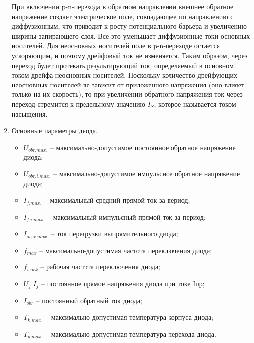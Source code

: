 \documentclass[a4paper,14pt]{article}
\begin{document}
\begin{enumerate}
	При включении p-n-перехода в обратном направлении внешнее обратное напряжение создает электрическое поле, совпадающее по направлению с диффузионным, что приводит к росту потенциального барьера и увеличению ширины запирающего слоя. 
	Все это уменьшает диффузионные токи основных носителей. 
	Для неосновных носителей поле в p-n-переходе остается ускоряющим, и поэтому дрейфовый ток не изменяется. Таким образом, через переход будет протекать результирующий ток, определяемый в основном током дрейфа неосновных носителей. 
	Поскольку количество дрейфующих неосновных носителей не зависит от приложенного напряжения (оно влияет только на их скорость), то при увеличении обратного напряжения ток через переход стремится к предельному значению $I_S$, которое называется током насыщения.

	\item Основные параметры диода.
	
	\begin{itemize}
      	\item $U_{obr.max.}$ -- максимально-допустимое постоянное обратное напряжение диода;
		
		\item $U_{obr.i.max.}$ -- максимально-допустимое импульсное обратное напряжение диода;
		
		\item $I_{f.max.}$ -- максимальный средний прямой ток за период;
		
		\item $I_{f.i.max.}$ -- максимальный импульсный прямой ток за период;
		
		\item $I_{over.max.}$ -- ток перегрузки выпрямительного диода;
		
		\item $f_{max}$ -- максимально-допустимая частота переключения диода;
		
		\item $f_{work}$ -- рабочая частота переключения диода;
		
		\item $U_{f} | I_{f}$ -- постоянное прямое напряжения диода при токе Iпр;
		
		\item $I_{obr}$ -- постоянный обратный ток диода;
		
		\item $T_{k.max.}$ -- максимально-допустимая температура корпуса диода;
		
		\item $T_{p.max.}$ -- максимально-допустимая температура перехода диода.
	\end{itemize}
	

\end{enumerate}
\end{document}
